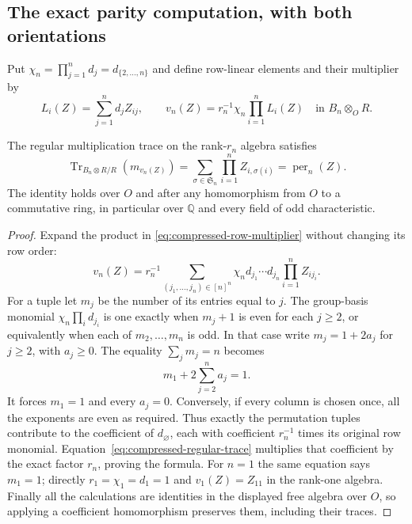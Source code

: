 \subsection{The exact parity computation, with both orientations}

Put $\chi_n=\prod_{j=1}^n d_j=d_{\{2,\ldots,n\}}$ and define
row-linear elements and their multiplier by
\begin{equation}\label{eq:compressed-row-multiplier}
 L_i(Z)=\sum_{j=1}^n d_j Z_{ij},\qquad
 v_n(Z)=r_n^{-1}\chi_n\prod_{i=1}^n L_i(Z)
 \quad\text{in }B_n\otimes_O R.
\end{equation}

\begin{theorem}\label{thm:compressed-permanent-trace}
The regular multiplication trace on the rank-$r_n$ algebra satisfies
\[
 \operatorname{Tr}_{B_n\otimes R/R}(m_{v_n(Z)})
 =\sum_{\sigma\in\mathfrak S_n}\prod_{i=1}^n Z_{i,\sigma(i)}
 =\operatorname{per}_n(Z).
\]
The identity holds over $O$ and after any homomorphism from $O$
to a commutative ring, in particular over $\mathbb Q$ and every
field of odd characteristic.
\end{theorem}
\begin{proof}
Expand the product in \eqref{eq:compressed-row-multiplier} without
changing its row order:
\[
 v_n(Z)=r_n^{-1}
 \sum_{(j_1,\ldots,j_n)\in[n]^n}
      \chi_n d_{j_1}\cdots d_{j_n}\prod_{i=1}^n Z_{ij_i}.
\]
For a tuple let $m_j$ be the number of its entries equal to $j$.
The group-basis monomial $\chi_n\prod_i d_{j_i}$ is one exactly
when $m_j+1$ is even for each $j\ge2$, or equivalently when each
of $m_2,\ldots,m_n$ is odd. In that case write $m_j=1+2a_j$
for $j\ge2$, with $a_j\ge0$. The equality $\sum_jm_j=n$ becomes
\[
 m_1+2\sum_{j=2}^n a_j=1.
\]
It forces $m_1=1$ and every $a_j=0$. Conversely, if every column
is chosen once, all the exponents are even as required. Thus exactly
the permutation tuples contribute to the coefficient of $d_\varnothing$,
each with coefficient $r_n^{-1}$ times its original row monomial.
Equation~\eqref{eq:compressed-regular-trace} multiplies that coefficient
by the exact factor $r_n$, proving the formula. For $n=1$ the
same equation says $m_1=1$; directly $r_1=\chi_1=d_1=1$ and
$v_1(Z)=Z_{11}$ in the rank-one algebra. Finally all the calculations
are identities in the displayed free algebra over $O$, so applying
a coefficient homomorphism preserves them, including their traces.
\end{proof}

